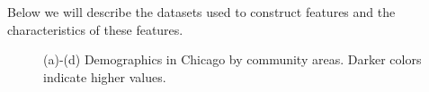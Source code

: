 Below we will describe the datasets used to construct features and the characteristics of these features.

\begin{figure}[t]
\centering
{}
\caption{(a)-(d) Demographics in Chicago by community areas. Darker colors indicate higher values.}
\label{fig:demo-f}
\end{figure}





